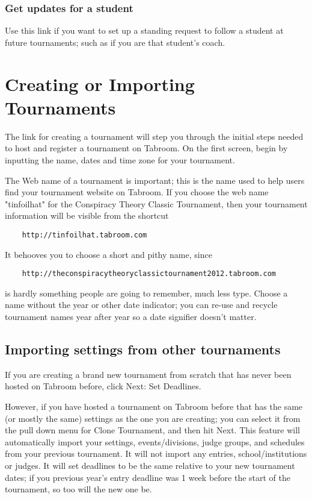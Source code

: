 \documentclass[12pt]{report}
\begin{document}
		\subsection{Get updates for a student} 

			Use this link if you want to set up a standing request to follow a
			student at future tournaments; such as if you are that student's coach.

\chapter{Creating or Importing Tournaments}

	The link for creating a tournament will step you through the initial steps
	needed to host and register a tournament on Tabroom.  On the first screen,
	begin by inputting the name, dates and time zone for your tournament.

	The Web name of a tournament is important; this is the name used to help
	users find your tournament website on Tabroom.  If you choose the web name
	"tinfoilhat" for the Conspiracy Theory Classic Tournament, then your tournament
	information will be visible from the shortcut 

	\begin{verbatim}
	http://tinfoilhat.tabroom.com
	\end{verbatim}
	
	It behooves you to choose a short and pithy name, since
	
	\begin{verbatim}
	http://theconspiracytheoryclassictournament2012.tabroom.com
	\end{verbatim}

	is hardly something people are going to remember, much less type.  Choose a
	name without the year or other date indicator; you can re-use and recycle
	tournament names year after year so a date signifier doesn't matter.

	\section{Importing settings from other tournaments}

		If you are creating a brand new tournament from scratch that has never
		been hosted on Tabroom before, click Next:  Set Deadlines.

		However, if you have hosted a tournament on Tabroom before that has the
		same (or mostly the same) settings as the one you are creating; you can
		select it from the pull down menu for Clone Tournament, and then hit
		Next.  This feature will automatically import your settings,
		events/divisions, judge groups, and schedules from your previous
		tournament.  It will not import any entries, school/institutions or
		judges.  It will set deadlines to be the same relative to your new
		tournament dates; if you previous year's entry deadline was 1 week
		before the start of the tournament, so too will the new one be.
\end{document}
